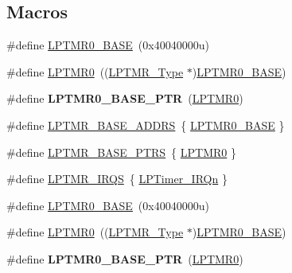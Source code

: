 \subsection*{Macros}
\begin{DoxyCompactItemize}
\item 
\#define \hyperlink{group__LPTMR__Peripheral__Access__Layer_ga024f362857a8b928d96cf3b3f5106793}{L\+P\+T\+M\+R0\+\_\+\+B\+A\+SE}~(0x40040000u)
\item 
\#define \hyperlink{group__LPTMR__Peripheral__Access__Layer_gaba0c3bc8a32ad5a884c99e019dbdef85}{L\+P\+T\+M\+R0}~((\hyperlink{structLPTMR__Type}{L\+P\+T\+M\+R\+\_\+\+Type} $\ast$)\hyperlink{group__LPTMR__Peripheral__Access__Layer_ga024f362857a8b928d96cf3b3f5106793}{L\+P\+T\+M\+R0\+\_\+\+B\+A\+SE})
\item 
\#define {\bfseries L\+P\+T\+M\+R0\+\_\+\+B\+A\+S\+E\+\_\+\+P\+TR}~(\hyperlink{group__LPTMR__Peripheral__Access__Layer_gaba0c3bc8a32ad5a884c99e019dbdef85}{L\+P\+T\+M\+R0})\hypertarget{group__LPTMR__Peripheral__Access__Layer_ga90a9194151ad11b422bcab162e797eda}{}\label{group__LPTMR__Peripheral__Access__Layer_ga90a9194151ad11b422bcab162e797eda}

\item 
\#define \hyperlink{group__LPTMR__Peripheral__Access__Layer_ga62b4c0fde534c2c09ef0c30b3c4bb0e3}{L\+P\+T\+M\+R\+\_\+\+B\+A\+S\+E\+\_\+\+A\+D\+D\+RS}~\{ \hyperlink{group__LPTMR__Peripheral__Access__Layer_ga024f362857a8b928d96cf3b3f5106793}{L\+P\+T\+M\+R0\+\_\+\+B\+A\+SE} \}
\item 
\#define \hyperlink{group__LPTMR__Peripheral__Access__Layer_gac92660dedc63be48d689d43efc9f2c82}{L\+P\+T\+M\+R\+\_\+\+B\+A\+S\+E\+\_\+\+P\+T\+RS}~\{ \hyperlink{group__LPTMR__Peripheral__Access__Layer_gaba0c3bc8a32ad5a884c99e019dbdef85}{L\+P\+T\+M\+R0} \}
\item 
\#define \hyperlink{group__LPTMR__Peripheral__Access__Layer_ga5bf0032641d320fc7d486d703800c729}{L\+P\+T\+M\+R\+\_\+\+I\+R\+QS}~\{ \hyperlink{group__Interrupt__vector__numbers_gga666eb0caeb12ec0e281415592ae89083acf59a0816d3c5ff26328c886c9d3af34}{L\+P\+Timer\+\_\+\+I\+R\+Qn} \}
\item 
\#define \hyperlink{group__LPTMR__Peripheral__Access__Layer_ga024f362857a8b928d96cf3b3f5106793}{L\+P\+T\+M\+R0\+\_\+\+B\+A\+SE}~(0x40040000u)
\item 
\#define \hyperlink{group__LPTMR__Peripheral__Access__Layer_gaba0c3bc8a32ad5a884c99e019dbdef85}{L\+P\+T\+M\+R0}~((\hyperlink{structLPTMR__Type}{L\+P\+T\+M\+R\+\_\+\+Type} $\ast$)\hyperlink{group__LPTMR__Peripheral__Access__Layer_ga024f362857a8b928d96cf3b3f5106793}{L\+P\+T\+M\+R0\+\_\+\+B\+A\+SE})
\item 
\#define {\bfseries L\+P\+T\+M\+R0\+\_\+\+B\+A\+S\+E\+\_\+\+P\+TR}~(\hyperlink{group__LPTMR__Peripheral__Access__Layer_gaba0c3bc8a32ad5a884c99e019dbdef85}{L\+P\+T\+M\+R0})\hypertarget{group__LPTMR__Peripheral__Access__Layer_ga90a9194151ad11b422bcab162e797eda}{}\label{group__LPTMR__Peripheral__Access__Layer_ga90a9194151ad11b422bcab162e797eda}


\end{DoxyCompactItemize}
